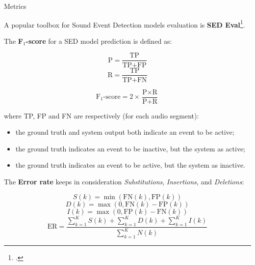 	\begin{frame}[allowframebreaks]{Metrics}
	
		A popular toolbox for Sound Event Detection models evaluation is \textbf{SED Eval}\footcite{app6060162}.
		
		The \textbf{F$_{1}$-score} for a SED model prediction is defined as:
		\vspace{-3em}
		\begin{multicols}{2}
  			\begin{equation*}
    			\text{P} = \frac{\text{TP}}{\text{TP} + \text{FP}}
  			\end{equation*}\break
  			\begin{equation*}
    			\text{R} = \frac{\text{TP}}{\text{TP} + \text{FN}}
  			\end{equation*}
		\end{multicols}
		\vspace{-1em}
		\begin{equation*}
			\text{F$_{1}$-score} = 2 \times \frac{\text{P} \times \text{R}}{\text{P} + \text{R}}
		\end{equation*}
		
		where TP, FP and FN are respectively (for each audio segment):
		\begin{itemize}
			\item the ground truth and system output both indicate an event to be active;
			\item the ground truth indicates an event to be inactive, but the system as active;
			\item the ground truth indicates an event to be active, but the system as inactive.
		\end{itemize}
		
		\framebreak
		
		The \textbf{Error rate} keeps in consideration \textit{Substitutions}, \textit{Insertions}, and \textit{Deletions}:\vspace{-1em}
		
		\begin{multicols}{2}		
  			\begin{equation*}
    			S(k)=\min(\text{FN}(k),\text{FP}(k))
  			\end{equation*}
  			\begin{equation*}
    			D(k)=\max(0,\text{FN}(k)-\text{FP}(k))
  			\end{equation*}
  			\begin{equation*}
    			I(k)=\max(0,\text{FP}(k)-\text{FN}(k))
  			\end{equation*}
			\break
  			\begin{equation*}
    			\text{ER}=\frac{\sum_{k=1}^{K}S(k)+\sum_{k=1}^{K}D(k)+\sum_{k=1}^{K}I(k)}{\sum_{k=1}^{K}N(k)}
  			\end{equation*}
		\end{multicols}


\end{frame}
